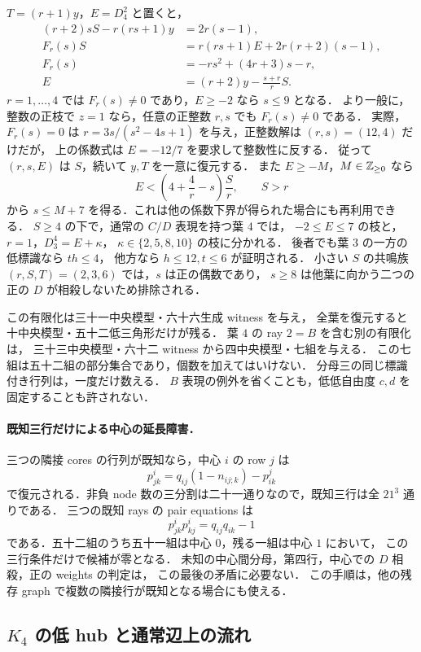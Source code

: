 $T=(r+1)y$，$E=D^2_4$ と置くと，
\begin{align*}
 (r+2)sS-r(rs+1)y&=2r(s-1),\\
 F_r(s)S&=r(rs+1)E+2r(r+2)(s-1),\\
 F_r(s)&=-rs^2+(4r+3)s-r,\\
 E&=(r+2)y-\frac{s+r}{r}S.
\end{align*}
$r=1,\ldots,4$ では $F_r(s)\ne0$ であり，$E\ge-2$ なら $s\le9$ となる．
より一般に，整数の正枝で $z=1$ なら，任意の正整数 $r,s$ でも $F_r(s)\ne0$ である．
実際，$F_r(s)=0$ は $r=3s/(s^2-4s+1)$ を与え，正整数解は $(r,s)=(12,4)$ だけだが，
上の係数式は $E=-12/7$ を要求して整数性に反する．
従って $(r,s,E)$ は $S$，続いて $y,T$ を一意に復元する．
また $E\ge-M$，$M\in\mathbb Z_{\ge0}$ なら
\[
 E<\left(4+\frac4r-s\right)\frac Sr,\qquad S>r
\]
から $s\le M+7$ を得る．これは他の係数下界が得られた場合にも再利用できる．
$S\ge4$ の下で，通常の $C/D$ 表現を持つ葉 $4$ では，
$-2\le E\le7$ の枝と，$r=1$，$D^4_3=E+\kappa$，
$\kappa\in\{2,5,8,10\}$ の枝に分かれる．
後者でも葉 $3$ の一方の低標識なら $th\le4$，
他方なら $h\le12,t\le6$ が証明される．
小さい $S$ の共鳴族 $(r,S,T)=(2,3,6)$ では，$s$ は正の偶数であり，
$s\ge8$ は他葉に向かう二つの正の $D$ が相殺しないため排除される．

この有限化は三十一中央模型・六十六生成 witness を与え，
全葉を復元すると十中央模型・五十二低三角形だけが残る．
葉 $4$ の ray $2=B$ を含む別の有限化は，
三十三中央模型・六十二 witness から四中央模型・七組を与える．
この七組は五十二組の部分集合であり，個数を加えてはいけない．
分母三の同じ標識付き行列は，一度だけ数える．
$B$ 表現の例外を省くことも，低低自由度 $c,d$ を固定することも許されない．

\paragraph{既知三行だけによる中心の延長障害．}
三つの隣接 cores の行列が既知なら，中心 $i$ の row $j$ は
\[
 p^i_{jk}=q_{ij}(1-n_{ij;k})-p^j_{ik}
\]
で復元される．非負 node 数の三分割は二十一通りなので，既知三行は全 $21^3$ 通りである．
三つの既知 rays の pair equations は
\[
 p^i_{jk}p^i_{kj}=q_{ij}q_{ik}-1
\]
である．五十二組のうち五十一組は中心 $0$，残る一組は中心 $1$ において，
この三行条件だけで候補が零となる．
未知の中心間分母，第四行，中心での $D$ 相殺，正の weights の判定は，
この最後の矛盾に必要ない．
この手順は，他の残存 graph で複数の隣接行が既知となる場合にも使える．

\subsection{\texorpdfstring{$K_4$}{K4} の低 hub と通常辺上の流れ}
\label{ng16:k4-flow}

